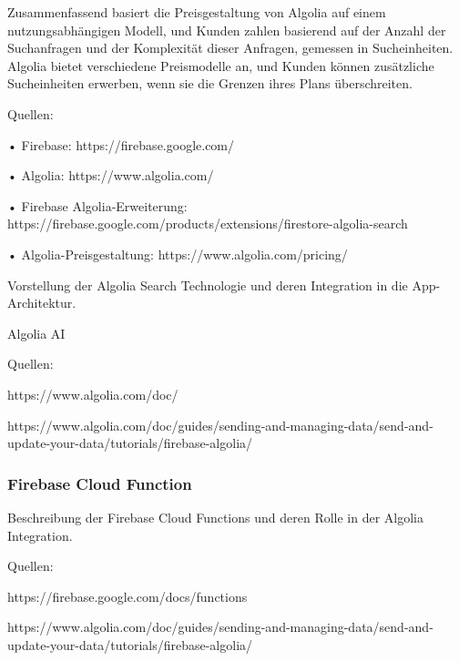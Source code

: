 Zusammenfassend basiert die Preisgestaltung von Algolia auf einem nutzungsabhängigen Modell, und Kunden zahlen basierend auf der Anzahl der Suchanfragen und der Komplexität dieser Anfragen, gemessen in Sucheinheiten. Algolia bietet verschiedene Preismodelle an, und Kunden können zusätzliche Sucheinheiten erwerben, wenn sie die Grenzen ihres Plans überschreiten.

Quellen:

•	Firebase: https://firebase.google.com/

•	Algolia: https://www.algolia.com/

•	Firebase Algolia-Erweiterung: https://firebase.google.com/products/extensions/firestore-algolia-search

•	Algolia-Preisgestaltung: https://www.algolia.com/pricing/




Vorstellung der Algolia Search Technologie und deren
Integration in die App-Architektur.

Algolia AI

Quellen:

https://www.algolia.com/doc/

https://www.algolia.com/doc/guides/sending-and-managing-data/send-and-update-your-data/tutorials/firebase-algolia/

\subsubsection{Firebase Cloud Function}

Beschreibung der Firebase Cloud Functions und deren Rolle in der Algolia Integration.

Quellen:

https://firebase.google.com/docs/functions

https://www.algolia.com/doc/guides/sending-and-managing-data/send-and-update-your-data/tutorials/firebase-algolia/
